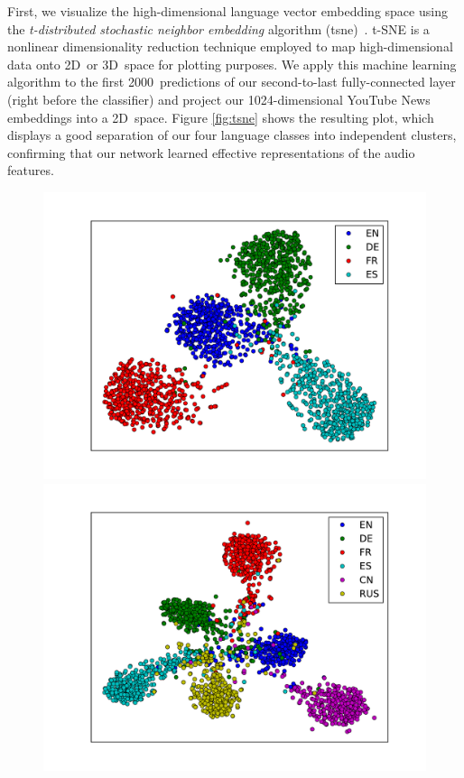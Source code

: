 First, we visualize the high-dimensional language vector embedding space using the \emph{t-distributed stochastic neighbor embedding} algorithm (\ac{tsne})~\cite{maaten2008visualizing}. t-SNE is a nonlinear dimensionality reduction technique employed to map high-dimensional data onto 2D~or 3D~space for plotting purposes. We apply this machine learning algorithm to the first \num{2000}~predictions of our second-to-last fully-connected layer (right before the classifier) and project our \num{1024}-dimensional YouTube News embeddings into a 2D~space. Figure \ref{fig:tsne} shows the resulting plot, which displays a good separation of our four language classes into independent clusters, confirming that our network learned effective representations of the audio features.
%
	\begin{figure}[tp]
	\centering
	\begin{minipage}{.5\textwidth}
	  \centering
	  \includegraphics[width=\linewidth]{plots/tsne.pdf}
	\end{minipage}%
	\begin{minipage}{.5\textwidth}
	  \centering
	  \includegraphics[width=\linewidth]{plots/tsne_6lang.pdf}

\end{minipage}
\end{figure}
